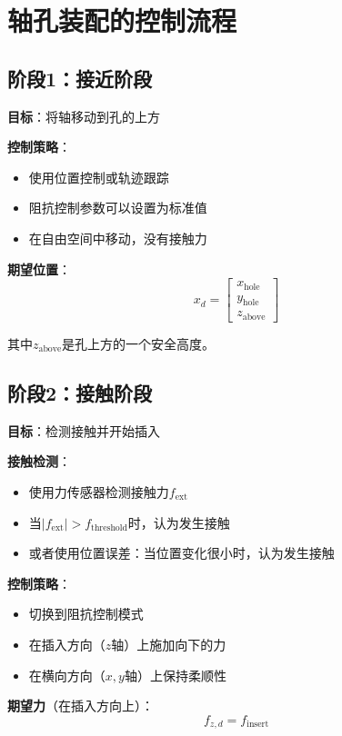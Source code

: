 \documentclass[12pt,a4paper]{article}
\begin{document}
\section{轴孔装配的控制流程}

\subsection{阶段1：接近阶段}

\textbf{目标}：将轴移动到孔的上方

\textbf{控制策略}：
\begin{itemize}
\item 使用位置控制或轨迹跟踪
\item 阻抗控制参数可以设置为标准值
\item 在自由空间中移动，没有接触力
\end{itemize}

\textbf{期望位置}：
\begin{equation}
x_d = \begin{bmatrix} x_{\text{hole}} \\ y_{\text{hole}} \\ z_{\text{above}} \end{bmatrix}
\end{equation}

其中$z_{\text{above}}$是孔上方的一个安全高度。

\subsection{阶段2：接触阶段}

\textbf{目标}：检测接触并开始插入

\textbf{接触检测}：
\begin{itemize}
\item 使用力传感器检测接触力$f_{\text{ext}}$
\item 当$|f_{\text{ext}}| > f_{\text{threshold}}$时，认为发生接触
\item 或者使用位置误差：当位置变化很小时，认为发生接触
\end{itemize}

\textbf{控制策略}：
\begin{itemize}
\item 切换到阻抗控制模式
\item 在插入方向（$z$轴）上施加向下的力
\item 在横向方向（$x, y$轴）上保持柔顺性
\end{itemize}

\textbf{期望力}（在插入方向上）：
\begin{equation}
f_{z,d} = f_{\text{insert}}
\end{equation}
\end{document}
